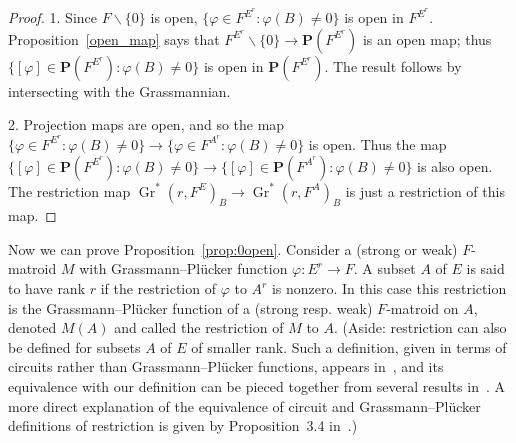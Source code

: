 \documentclass[10pt, preprint]{article}
\theoremstyle{definition}
\begin{document}
\begin{proof}
1. Since $F \backslash \{0\}$ is open, $\{\varphi \in F^{E^{r}} :
\varphi (B) \neq 0\}$ is open in $F^{E^{r}}$. Proposition~\ref{open_map} says that $F^{E^{r}} \backslash \{0\} \to \mathbf{P}(F
^{E^{r}})$ is an open map; thus $\{[\varphi ] \in \mathbf{P}(F^{E^{r}})
: \varphi (B) \neq 0\}$ is open in $\mathbf{P}(F^{E^{r}})$. The result
follows by intersecting with the Grassmannian.

2. Projection maps are open, and so the map $\{\varphi \in F^{E^{r}}:
\varphi (B) \neq 0\}\to \{\varphi \in F^{A^{r}}: \varphi (B) \neq 0\}$
is open. Thus the map $\{[\varphi ]\in \mathbf{P}(F^{E^{r}}):\varphi
(B)\neq 0\}\to \{[\varphi ]\in \mathbf{P}(F^{A^{r}}): \varphi (B)
\neq 0\}$ is also open. The restriction map $\operatorname{Gr}^{*}(r,
F^{E})_{B}\to \operatorname{Gr}^{*}(r, F^{A})_{B}$ is just a restriction
of this map.
\end{proof}

Now we can prove Proposition~\ref{prop:0open}. Consider a (strong or
weak) $F$-matroid $M$ with Grassmann--Pl\"{u}cker function $\varphi :E
^{r}\to F$. A subset $A$ of $E$ is said to have rank $r$ if the
restriction of $\varphi $ to $A^{r}$ is nonzero. In this case this
restriction is the Grassmann--Pl\"{u}cker function of a (strong
resp. weak) $F$-matroid on $A$, denoted $M(A)$ and called the
restriction of $M$ to $A$. (Aside: restriction can also be defined for
subsets $A$ of $E$ of smaller rank. Such a definition, given in terms
of circuits rather than Grassmann--Pl\"{u}cker functions, appears
in~\cite{Baker-Bowler}, and its equivalence with our definition
can be pieced together from several results
in~\cite{Baker-Bowler}. A more direct explanation of the
equivalence of circuit and Grassmann--Pl\"{u}cker definitions of
restriction is given by Proposition~3.4 in~\cite{EJS}.)
\end{document}
